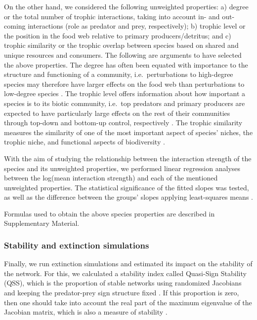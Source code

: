 \documentclass[gc, manuscript]{copernicus}
\begin{document}
On the other hand, we considered the following unweighted properties: a)
degree or the total number of trophic interactions, taking into account
in- and out-coming interactions (role as predator and prey,
respectively); b) trophic level or the position in the food web relative
to primary producers/detritus; and c) trophic similarity or the trophic
overlap between species based on shared and unique resources and
consumers. The following are arguments to have selected the above
properties. The degree has often been equated with importance to the
structure and functioning of a community, i.e.~perturbations to
high-degree species may therefore have larger effects on the food web
than perturbations to low-degree species
\citetext{\citealp{Dunne2002a}; \citealp[references
in][]{Cirtwill2018a}}. The trophic level offers information about how
important a species is to its biotic community, i.e.~top predators and
primary producers are expected to have particularly large effects on the
rest of their communities through top-down and bottom-up control,
respectively \citep[references in][]{Cirtwill2018a}. The trophic
similarity measures the similarity of one of the most important aspect
of species' niches, the trophic niche, and functional aspects of
biodiversity \citep{Martinez1991, Williams2000}.

With the aim of studying the relationship between the interaction
strength of the species and its unweighted properties, we performed
linear regression analyses between the log(mean interaction strength)
and each of the mentioned unweighted properties. The statistical
significance of the fitted slopes was tested, as well as the difference
between the groups' slopes applying least-squares means
\citep{Harvey1960}.

Formulas used to obtain the above species properties are described in
Supplementary Material.

\subsubsection{Stability and extinction simulations}

Finally, we run extinction simulations and estimated its impact on the
stability of the network. For this, we calculated a stability index
called Quasi-Sign Stability (QSS), which is the proportion of stable
networks using randomized Jacobians and keeping the predator-prey sign
structure fixed \citep{Allesina2008}. If this proportion is zero, then
one should take into account the real part of the maximum eigenvalue of
the Jacobian matrix, which is also a measure of stability
\citep{Grilli2016}.
\end{document}
